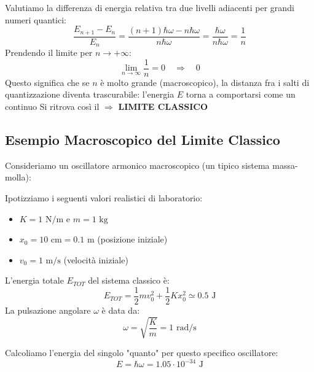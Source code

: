 \documentclass[11pt, a4paper]{article}
\begin{document}
Valutiamo la differenza di energia relativa tra due livelli adiacenti per grandi numeri quantici: %
\begin{equation*}
    \frac{E_{n+1} - E_n}{E_n} = \frac{(n+1)\hbar\omega - n\hbar\omega}{n\hbar\omega} = \frac{\hbar\omega}{n\hbar\omega} = \frac{1}{n} %
\end{equation*}
Prendendo il limite per $n \to +\infty$: %
\begin{equation*}
    \lim_{n \to \infty} \frac{1}{n} = 0 \quad \Rightarrow \quad 0 %
\end{equation*}
Questo significa che se $n$ è molto grande (macroscopico), la distanza fra i salti di quantizzazione diventa trascurabile: l'energia $E$ torna a comportarsi come un continuo %
Si ritrova così il $\Rightarrow$ \textbf{LIMITE CLASSICO} %


\subsection{Esempio Macroscopico del Limite Classico} %

Consideriamo un oscillatore armonico macroscopico (un tipico sistema massa-molla): %

Ipotizziamo i seguenti valori realistici di laboratorio: %
\begin{itemize}
    \item $K = 1 \text{ N/m}$ e $m = 1 \text{ kg}$ %
    \item $x_0 = 10 \text{ cm} = 0.1 \text{ m}$ (posizione iniziale) %
    \item $v_0 = 1 \text{ m/s}$ (velocità iniziale) %
\end{itemize}

L'energia totale $E_{TOT}$ del sistema classico è: %
\begin{equation*}
    E_{TOT} = \frac{1}{2} m v_0^2 + \frac{1}{2} K x_0^2 \simeq 0.5 \text{ J} %
\end{equation*}
La pulsazione angolare $\omega$ è data da: %
\begin{equation*}
    \omega = \sqrt{\frac{K}{m}} = 1 \text{ rad/s} %
\end{equation*}

Calcoliamo l'energia del singolo "quanto" per questo specifico oscillatore: %
\begin{equation*}
    E = \hbar \omega = 1.05 \cdot 10^{-34} \text{ J} %
\end{equation*}
\end{document}
